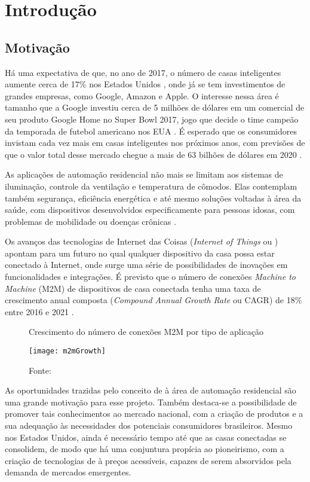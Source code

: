 \chapter{Introdução}

\section{Motivação}
Há uma expectativa de que, no ano de 2017, o número de casas inteligentes aumente cerca de 17\% nos Estados Unidos \cite{mckinseyReport}, onde já se tem investimentos de grandes empresas, como Google, Amazon e Apple. O interesse nessa área é tamanho que a Google investiu cerca de 5 milhões de dólares em um comercial de seu produto Google Home no Super Bowl 2017, jogo que decide o time campeão da temporada de futebol americano nos EUA \cite{kennemer}. É esperado que os consumidores invistam cada vez mais em casas inteligentes nos próximos anos, com previsões de que o valor total desse mercado chegue a mais de 63 bilhões de dólares em 2020 \cite{businessWire}.

As aplicações de automação residencial não mais se limitam aos sistemas de iluminação, controle da ventilação e temperatura de cômodos. Elas contemplam também segurança, eficiência energética e até mesmo soluções voltadas à área da saúde, com dispositivos desenvolvidos especificamente para pessoas idosas, com problemas de mobilidade ou doenças crônicas \cite{iscoop}.

Os avanços das tecnologias de Internet das Coisas (\textit{Internet of Things} ou \wiot{}) apontam para um futuro no qual qualquer dispositivo da casa possa estar conectado à Internet, onde surge uma série de possibilidades de inovações em funcionalidades e integrações. É previsto que o número de conexões \textit{Machine to Machine} (M2M) de dispositivos de casa conectada tenha uma taxa de crescimento anual composta (\emph{Compound Annual Growth Rate} ou CAGR) de 18\% entre 2016 e 2021 \cite{ciscoReport}.

\begin{figure}[H]
	\centering
	\caption{Crescimento do número de conexões M2M por tipo de aplicação}
  \texttt{[image: m2mGrowth]}
	\caption*{Fonte: \cite{ciscoReport}}
\label{fig:m2mGrowth}
\end{figure}

As oportunidades trazidas pelo conceito de \wiot{} à área de automação residencial são uma grande motivação para esse projeto. Também destaca-se a possibilidade de promover tais conhecimentos ao mercado nacional, com a criação de produtos e a sua adequação às necessidades dos potenciais consumidores brasileiros. Mesmo nos Estados Unidos, ainda é necessário tempo até que as casas conectadas se consolidem, de modo que há uma conjuntura propícia ao pioneirismo, com a criação de tecnologias de \wiot{} à preços acessíveis, capazes de serem absorvidos pela demanda de mercados emergentes.

